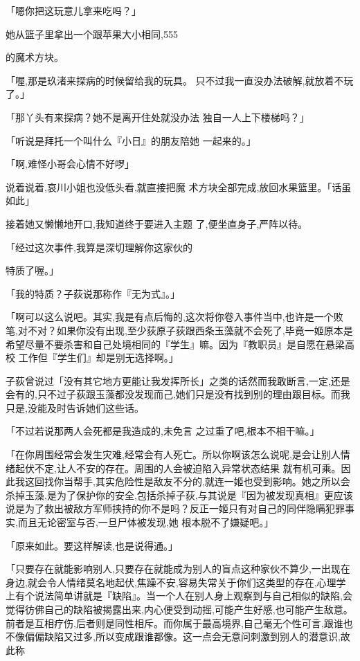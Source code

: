 \documentclass{article}
\begin{document}
「嗯你把这玩意儿拿来吃吗？」 

她从篮子里拿出一个跟苹果大小相同,555
\newpage

的魔术方块。 

「喔,那是玖渚来探病的时候留给我的玩具。
只不过我一直没办法破解,就放着不玩了。」 

「那丫头有来探病？她不是离开住处就没办法
独自一人上下楼梯吗？」 

「听说是拜托一个叫什么『小日』的朋友陪她
一起来的。」 


「啊,难怪小哥会心情不好啰」 

说着说着,哀川小姐也没低头看,就直接把魔
术方块全部完成,放回水果篮里。「话虽如此」 

接着她又懒懒地开口,我知道终于要进入主题
了,便坐直身子,严阵以待。 

「经过这次事件,我算是深切理解你这家伙的

\newpage
特质了喔。」 


「我的特质？子荻说那称作『无为式』。」 

「啊可以这么说吧。其实,我是有点后悔的,这次将你卷入事件当中,也许是一个败笔,对不对？如果你没有出现,至少荻原子荻跟西条玉藻就不会死了,毕竟一姬原本是希望尽量不要杀害和自己处境相同的『学生』嘛。因为『教职员』是自愿在悬梁高校
工作但『学生们』却是别无选择啊。」 

子荻曾说过「没有其它地方更能让我发挥所长」之类的话然而我敢断言,一定,还是会有的,只不过子荻跟玉藻都没发现而己,她们只是没有找到别的理由跟目标。而我只是,没能及时告诉她们这些话。

「不过若说那两人会死都是我造成的,未免言
之过重了吧,根本不相干嘛。」 

「在你周围经常会发生灾难,经常会有人死亡。所以你啊该怎么说呢,是会让别人情绪起伏不定,让人不安的存在。周围的人会被迫陷入异常状态结果
\newpage
就有机可乘。因此我这回找你当帮手,其实危险性是敌友不分的,就连一姬也受到影响。她之所以会杀掉玉藻,是为了保护你的安全,包括杀掉子荻,与其说是『因为被发现真相』更应该说是为了救出被敌方军师挟持的你不是吗？反正一姬只有对自己的同伴隐瞒犯罪事实,而且无论密室与否,一旦尸体被发现,她
根本脱不了嫌疑吧。」 


「原来如此。要这样解读,也是说得通。」 

「只要存在就能影响别人,只要存在就能成为别人的盲点这种家伙不算少,一出现在身边,就会令人情绪莫名地起伏,焦躁不安,容易失常关于你们这类型的存在,心理学上有个说法简单讲就是『缺陷』。当一个人在别人身上观察到与自己相似的缺陷,会觉得彷佛自己的缺陷被揭露出来,内心便受到动摇,可能产生好感,也可能产生敌意。前者是互相疗伤,后者则是同性相斥。而你属于最高境界,自己毫无个性可言,跟谁也不像偏偏缺陷又过多,所以变成跟谁都像。这一点会无意问刺激到别人的潜意识,故此称
\end{document}

